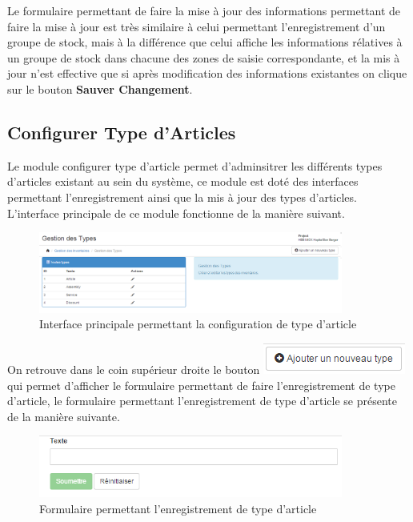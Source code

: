 \documentclass[12pt,a4paper]{report}
\begin{document}
Le formulaire permettant de faire la mise à jour des informations permettant de faire la mise à jour est très similaire à celui permettant l'enregistrement d'un groupe de stock, mais à la différence que celui affiche les informations rélatives à un groupe de stock dans chacune des zones de saisie correspondante, et la mis à jour n'est effective que si après modification des informations existantes on clique sur le bouton \textbf{Sauver Changement}.


\subsection{Configurer Type d'Articles}
Le module configurer type d'article permet d'adminsitrer les différents types d'articles existant au sein du système, ce module est doté des interfaces permettant l'enregistrement ainsi que la mis à jour des types d'articles. L'interface principale de ce module fonctionne de la manière suivant.

\begin{figure}[h]
\begin{center}
\includegraphics[width=10cm]{pic/GesTypesArticle.png}
\end{center}
\caption{Interface principale permettant la configuration de type d'article}
\label{Interface principale permettant la configuration de type d'article}
\end{figure}

On retrouve dans le coin supérieur droite le bouton \includegraphics[scale=0.7]{pic/AddnewType.png} qui permet d'afficher le formulaire permettant de faire l'enregistrement de type d'article, le formulaire permettant l'enregistrement de type d'article se présente de la manière suivante.

\begin{figure}[h]
\begin{center}
\includegraphics[width=10cm]{pic/FormAddTypeArt.png}
\end{center}
\caption{Formulaire permettant l'enregistrement de type d'article}
\label{Formulaire permettant l'enregistrement de type d'article}
\end{figure}
\end{document}
